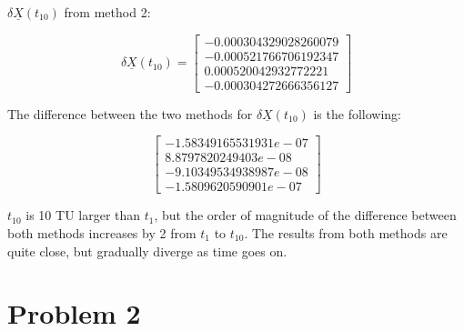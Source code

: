 \documentclass[conf]{new-aiaa}
\begin{document}
$\delta \underline{X}(t_{10})$ from method 2: 

\begin{equation}
\delta \underline{X}(t_{10}) = 
\begin{bmatrix}
     -0.000304329028260079 \\
	-0.000521766706192347 \\
	0.000520042932772221 \\
	-0.000304272666356127
\end{bmatrix}
\end{equation}

The difference between the two methods for $\delta \underline{X}(t_{10})$ is the following: 

\begin{equation}
	\begin{bmatrix}
	     -1.58349165531931e-07 \\
		8.8797820249403e-08 \\
		-9.10349534938987e-08 \\
		-1.5809620590901e-07
	\end{bmatrix}
\end{equation}

$t_{10}$ is 10 TU larger than $t_1$, but the order of magnitude of the difference between both methods increases by 2 from $t_1$ to $t_{10}$. The results from both methods are quite close, but gradually diverge as time goes on. 



\section*{Problem 2} 

\begin{center}
	 \\
\end{center}
\end{document}
